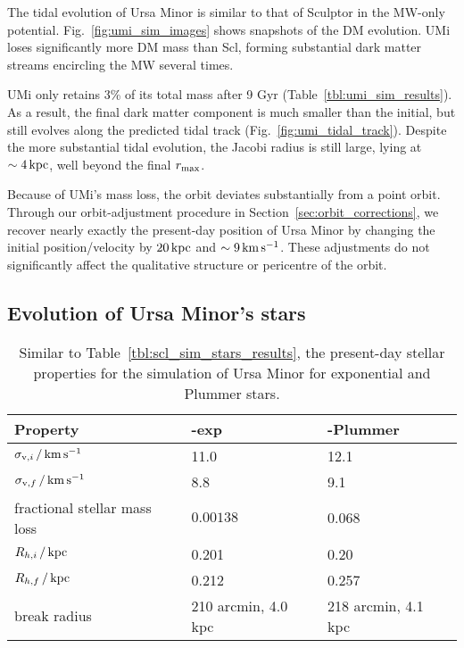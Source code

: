 The tidal evolution of Ursa Minor is similar to that of Sculptor in the
MW-only potential. Fig.~\ref{fig:umi_sim_images} shows snapshots of the
DM evolution. UMi loses significantly more DM mass than Scl, forming
substantial dark matter streams encircling the MW several times.

UMi only retains 3\% of its total mass after 9 Gyr
(Table~\ref{tbl:umi_sim_results}). As a result, the final dark matter
component is much smaller than the initial, but still evolves along the
predicted tidal track (Fig.~\ref{fig:umi_tidal_track}). Despite the more
substantial tidal evolution, the Jacobi radius is still large, lying at
\(\sim 4\,{\rm kpc}\), well beyond the final \(r_{\rm max}\).

Because of UMi's mass loss, the orbit deviates substantially from a
point orbit. Through our orbit-adjustment procedure in
Section~\ref{sec:orbit_corrections}, we recover nearly exactly the
present-day position of Ursa Minor by changing the initial
position/velocity by \(20\,{\rm kpc}\) and \(\sim 9\,{\rm km\,s^{-1}}\). These
adjustments do not significantly affect the qualitative structure or
pericentre of the orbit.

\subsection{Evolution of Ursa Minor's
stars}\label{evolution-of-ursa-minors-stars}

\begin{table*}[t]
\centering
\caption[Simulation results for Ursa Minor’s stars]{Similar to Table \ref{tbl:scl_sim_stars_results}, the present-day stellar properties for the simulation of Ursa Minor for exponential and Plummer stars. }
\label{tbl:umi_sim_stars_results}
\begin{tabular}{lll}
\toprule
Property & \smallperi{}-exp & \smallperi{}-Plummer\\
\midrule
$\sigma_{{\rm v}, i}\,/\,{\rm km\,s^{-1}}$ & 11.0 & 12.1\\
$\sigma_{{\rm v}, f}\,/\,{\rm km\,s^{-1}}$ & 8.8 & 9.1\\
fractional stellar mass loss & $0.00138$ & 0.068\\
$R_{h, i}\,/\,{\rm kpc}$ & 0.201 & 0.20\\
$R_{h, f}\,/\,{\rm kpc}$ & 0.212 & 0.257\\
break radius & 210 arcmin, 4.0 kpc & 218 arcmin, 4.1 kpc\\
\bottomrule
\end{tabular}
\end{table*}

